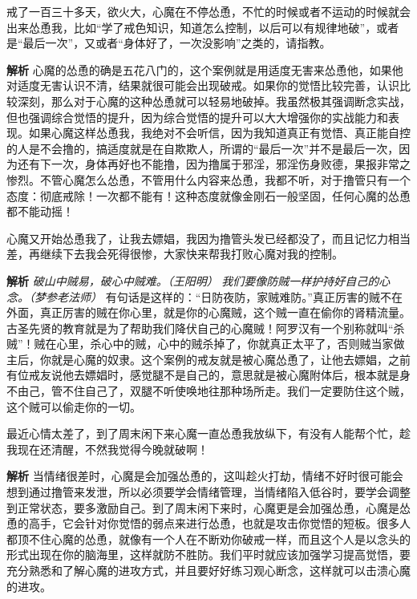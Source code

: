 \begin{case}[脑中的短信]
    戒了一百三十多天，欲火大，心魔在不停怂恿，不忙的时候或者不运动的时候就会出来怂恿我，比如“学了戒色知识，知道怎么控制，以后可以有规律地破”，或者是“最后一次”，又或者“身体好了，一次没影响”之类的，请指教。

    \textbf{解析} 心魔的怂恿的确是五花八门的，这个案例就是用适度无害来怂恿他，如果他对适度无害认识不清，结果就很可能会出现破戒。如果你的觉悟比较完善，认识比较深刻，那么对于心魔的这种怂恿就可以轻易地破掉。我虽然极其强调断念实战，但也强调综合觉悟的提升，因为综合觉悟的提升可以大大增强你的实战能力和表现。如果心魔这样怂恿我，我绝对不会听信，因为我知道真正有觉悟、真正能自控的人是不会撸的，搞适度就是在自欺欺人，所谓的“最后一次”并不是最后一次，因为还有下一次，身体再好也不能撸，因为撸属于邪淫，邪淫伤身败德，果报非常之惨烈。不管心魔怎么怂恿，不管用什么内容来怂恿，我都不听，对于撸管只有一个态度：彻底戒除！一次都不能有！这种态度就像金刚石一般坚固，任何心魔的怂恿都不能动摇！
\end{case}

\begin{case}[破心中贼]
    心魔又开始怂恿我了，让我去嫖娼，我因为撸管头发已经都没了，而且记忆力相当差，再继续下去我会死得很惨，大家快来帮我打败心魔对我的控制。

    \textbf{解析} \textit{破山中贼易，破心中贼难。（王阳明）} \textit{我们要像防贼一样护持好自己的心念。（梦参老法师）} 有句话是这样的：“日防夜防，家贼难防。”真正厉害的贼不在外面，真正厉害的贼在你心里，就是你的心魔贼，这个贼一直在偷你的肾精流量。古圣先贤的教育就是为了帮助我们降伏自己的心魔贼！阿罗汉有一个别称就叫“杀贼”！贼在心里，杀心中的贼，心中的贼杀掉了，你就真正太平了，否则贼当家做主后，你就是心魔的奴隶。这个案例的戒友就是被心魔怂恿了，让他去嫖娼，之前有位戒友说他去嫖娼时，感觉腿不是自己的，意思就是被心魔附体后，根本就是身不由己，管不住自己了，双腿不听使唤地往那种场所走。我们一定要防住这个贼，这个贼可以偷走你的一切。
\end{case}

\begin{case}[破心中贼]
    最近心情太差了，到了周末闲下来心魔一直怂恿我放纵下，有没有人能帮个忙，趁我现在还清醒，不然我觉得今晚就破啊！

    \textbf{解析} 当情绪很差时，心魔是会加强怂恿的，这叫趁火打劫，情绪不好时很可能会想到通过撸管来发泄，所以必须要学会情绪管理，当情绪陷入低谷时，要学会调整到正常状态，要多激励自己。到了周末闲下来时，心魔更是会加强怂恿，心魔是怂恿的高手，它会针对你觉悟的弱点来进行怂恿，也就是攻击你觉悟的短板。很多人都顶不住心魔的怂恿，就像有一个人在不断劝你破戒一样，而且这个人是以念头的形式出现在你的脑海里，这样就防不胜防。我们平时就应该加强学习提高觉悟，要充分熟悉和了解心魔的进攻方式，并且要好好练习观心断念，这样就可以击溃心魔的进攻。
\end{case}

